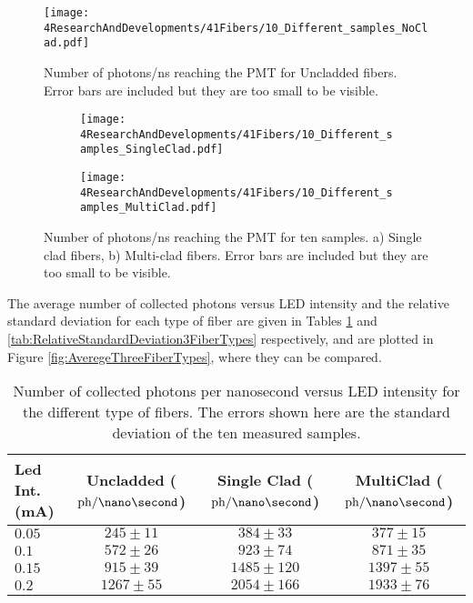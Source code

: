 \begin{figure}[h]
\centering
\texttt{[image: 4ResearchAndDevelopments/41Fibers/10\_Different\_samples\_NoClad.pdf]}
\caption{Number of photons/ns reaching the PMT for Uncladded fibers. Error bars are included but they are too small to be visible.\label{fig:10samplesNC}}
\end{figure}

\begin{figure}
\centering
    \begin{subfigure}[b]{1\textwidth}
    \centering
    \texttt{[image: 4ResearchAndDevelopments/41Fibers/10\_Different\_samples\_SingleClad.pdf]}  
    \caption{\label{subfig:10samplesSC}}
    \end{subfigure}
    \hfill
    \begin{subfigure}[b]{1\textwidth}
    \centering
    \texttt{[image: 4ResearchAndDevelopments/41Fibers/10\_Different\_samples\_MultiClad.pdf]}  
    \caption{\label{subfig:10samplesMC}}
    \end{subfigure}
 \caption{Number of photons/ns reaching the PMT for ten samples. a) Single clad fibers, b) Multi-clad fibers. Error bars are included but they are too small to be visible.}
 \label{fig:10samplesThreeTypes}
\end{figure}
The average number of collected photons versus LED intensity and the relative standard deviation for each type of fiber are given in Tables \ref{tab:10DifferentSamples} and \ref{tab:RelativeStandardDeviation3FiberTypes} respectively, and are plotted in Figure \ref{fig:AveregeThreeFiberTypes}, where they can be compared. 

\begin{table}[h]
\centering{}%
\begin{tabular}{lccc}
\toprule 
Led Int. (mA) & Uncladded ($\text{ph}/\nano\second$) & Single Clad ($\text{ph}/\nano\second$) & MultiClad ($\text{ph}/\nano\second$) \tabularnewline
\midrule
\midrule 
$0.05$ & $245 \pm 11$ & $384 \pm 33$ & $377 \pm 15$ \tabularnewline
$0.1$ & $572 \pm 26$ & $923 \pm 74$ & $871 \pm 35$ \tabularnewline
$0.15$ & $915 \pm 39$ & $1485 \pm 120$ & $1397 \pm 55$ \tabularnewline
$0.2$ & $1267 \pm 55$ & $2054 \pm 166$ & $1933 \pm 76$ \tabularnewline
\bottomrule
\end{tabular}
\caption{Number of collected photons per nanosecond versus LED intensity for the different type of fibers. The errors shown here are the standard deviation of the ten measured samples.}
\label{tab:10DifferentSamples}
\end{table}

